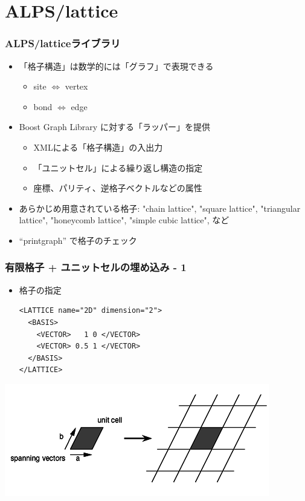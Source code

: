 \section{ALPS/lattice}
\begin{frame} 
  \frametitle{ALPS/latticeライブラリ}
  \begin{itemize}
    \setlength{\itemsep}{1em}
  \item 「格子構造」は数学的には「グラフ」で表現できる
    \begin{itemize}
    \item site $\Leftrightarrow$ vertex
    \item bond $\Leftrightarrow$ edge
    \end{itemize}
  \item Boost Graph Library に対する「ラッパー」を提供
    \begin{itemize}
    \item XMLによる「格子構造」の入出力
    \item 「ユニットセル」による繰り返し構造の指定
    \item 座標、パリティ、逆格子ベクトルなどの属性
    \end{itemize}
  \item あらかじめ用意されている格子: "chain lattice", "square lattice", "triangular lattice", "honeycomb lattice", "simple cubic lattice", など
  \item ``printgraph'' で格子のチェック
  \end{itemize}
\end{frame}

\begin{frame}[t,fragile]
  \frametitle{有限格子 + ユニットセルの埋め込み - 1}
  \begin{itemize}
  \item 格子の指定
  \begin{lstlisting}
<LATTICE name="2D" dimension="2">
  <BASIS>
    <VECTOR>   1 0 </VECTOR>
    <VECTOR> 0.5 1 </VECTOR>
  </BASIS>
</LATTICE>
\end{lstlisting}
  \end{itemize}
  \begin{center}
    \includegraphics[height=0.3\textheight]{TutorialLatticeHOWTOLattice1}
  \end{center}
\end{frame}

